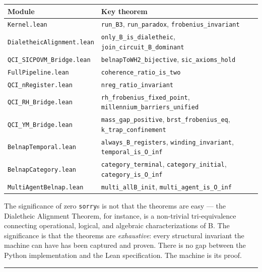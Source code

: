 \documentclass[12pt,a4paper]{article}
\begin{document}
\begin{table}[htbp]
\centering
\small
{}
\begin{tabularx}{\textwidth}{>{\centering\arraybackslash}X >{\centering\arraybackslash}X}
\toprule
\rowcolor{gray!25}\textbf{Module} & \textbf{Key theorem} \\
\midrule
\rowcolors{1}{white}{gray!10}
\texttt{Kernel.lean} & \texttt{run\_B3}, \texttt{run\_paradox}, \texttt{frobenius\_invariant} \\
\texttt{DialetheicAlignment.lean} & \texttt{only\_B\_is\_dialetheic}, \texttt{join\_circuit\_B\_dominant} \\
\texttt{QCI\_SICPOVM\_Bridge.lean} & \texttt{belnapToWH2\_bijective}, \texttt{sic\_axioms\_hold} \\
\texttt{FullPipeline.lean} & \texttt{coherence\_ratio\_is\_two} \\
\texttt{QCI\_nRegister.lean} & \texttt{nreg\_ratio\_invariant} \\
\texttt{QCI\_RH\_Bridge.lean} & \texttt{rh\_frobenius\_fixed\_point}, \texttt{millennium\_barriers\_unified} \\
\texttt{QCI\_YM\_Bridge.lean} & \texttt{mass\_gap\_positive}, \texttt{brst\_frobenius\_eq}, \texttt{k\_trap\_confinement} \\
\texttt{BelnapTemporal.lean} & \texttt{always\_B\_registers}, \texttt{winding\_invariant}, \texttt{temporal\_is\_O\_inf} \\
\texttt{BelnapCategory.lean} & \texttt{category\_terminal}, \texttt{category\_initial}, \texttt{category\_is\_O\_inf} \\
\texttt{MultiAgentBelnap.lean} & \texttt{multi\_allB\_init}, \texttt{multi\_agent\_is\_O\_inf} \\
\bottomrule
\end{tabularx}
\end{table}

The significance of zero \texttt{sorry}s is not that the theorems are easy --- the Dialetheic Alignment Theorem, for instance, is a non-trivial tri-equivalence connecting operational, logical, and algebraic characterizations of B. The significance is that the theorems are \emph{exhaustive}: every structural invariant the machine can have has been captured and proven. There is no gap between the Python implementation and the Lean specification. The machine is its proof.

\begin{center}
\rule{0.5\textwidth}{0.4pt}
\end{center}
\end{document}
